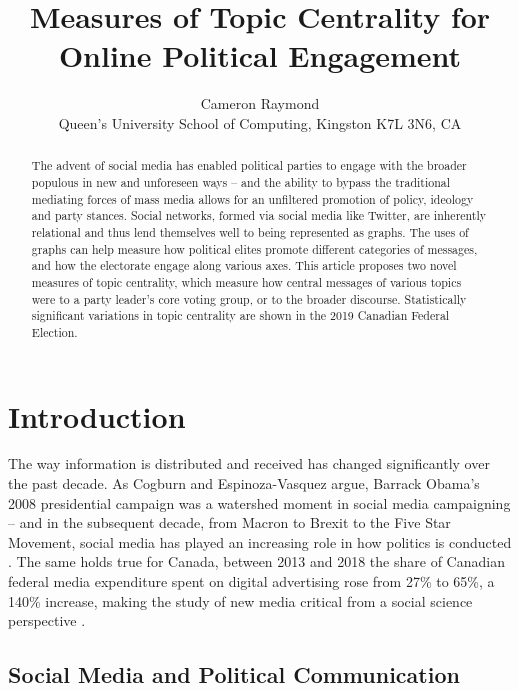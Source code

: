 \documentclass{nws}
\title[Measures of Topic Centrality for Online Political Engagement]
      {Measures of Topic Centrality for Online Political Engagement}
\author[C.J.K Raymond]
        {Cameron Raymond\\
         Queen's University School of Computing, Kingston K7L 3N6, CA\\
         \email{c.raymond@queensu.ca}}
\begin{document}
\label{firstpage}

\maketitle

\begin{abstract}
  The advent of social media has enabled political parties to engage with the
  broader populous in new and unforeseen ways -- and the ability to bypass the
  traditional mediating forces of mass media allows for an unfiltered promotion
  of policy, ideology and party stances. Social networks, formed via social
  media like Twitter, are inherently relational and thus lend themselves well to
  being represented as graphs. The uses of graphs can help measure how political
  elites promote different categories of messages, and how the electorate engage
  along various axes. This article proposes two novel measures of topic
  centrality, which measure how central messages of various topics were to a party
  leader's core voting group, or to the broader discourse. Statistically
  significant variations in topic centrality are shown in the 2019 Canadian
  Federal Election.
\end{abstract}

\tableofcontents

\section{Introduction}

The way information is distributed and received has changed significantly over
the past decade. As Cogburn and Espinoza-Vasquez argue, Barrack Obama’s 2008
presidential campaign was a watershed moment in social media campaigning – and
in the subsequent decade, from Macron to Brexit to the Five Star Movement,
social media has played an increasing role in how politics is conducted \cite{cogburn2011networked}. The
same holds true for Canada, between 2013 and 2018 the share of Canadian federal
media expenditure spent on digital advertising rose from 27\% to 65\%, a 140\%
increase, making the study of new media critical from a social science
perspective \cite{annualReportCanadaAdvertisingActivities_2018}.

\subsection{Social Media and Political Communication}
\end{document}
